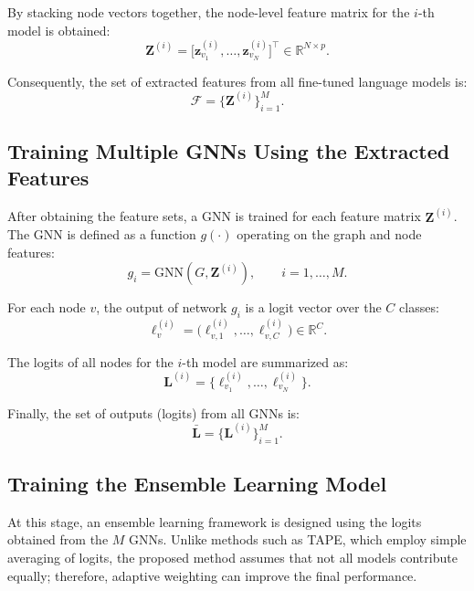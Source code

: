 \documentclass[a4paper,fleqn]{cas-sc}
\begin{document}
By stacking node vectors together, the node-level feature matrix for the $i$-th model is obtained:
\begin{equation}
\mathbf{Z}^{(i)}=\big[\mathbf{z}^{(i)}_{v_1},\dots,\mathbf{z}^{(i)}_{v_N}\big]^{\top}\in\mathbb{R}^{N\times p}.
\end{equation}

Consequently, the set of extracted features from all fine-tuned language models is:
\begin{equation}
\mathcal{F}=\{\mathbf{Z}^{(i)}\}_{i=1}^{M}.
\end{equation}

\subsection{Training Multiple GNNs Using the Extracted Features}

After obtaining the feature sets, a GNN is trained for each feature matrix $\mathbf{Z}^{(i)}$. The GNN is defined as a function $g(\cdot)$ operating on the graph and node features:
\begin{equation}
g_i = \mathrm{GNN}(G,\mathbf{Z}^{(i)}), \qquad i=1,\dots,M.
\end{equation}

For each node $v$, the output of network $g_i$ is a logit vector over the $C$ classes:
\begin{equation}
\boldsymbol{\ell}^{(i)}_{v}=\big(\ell^{(i)}_{v,1},\dots,\ell^{(i)}_{v,C}\big)\in\mathbb{R}^{C}.
\end{equation}

The logits of all nodes for the $i$-th model are summarized as:
\begin{equation}
\mathbf{L}^{(i)}=\{\boldsymbol{\ell}^{(i)}_{v_1},\dots,\boldsymbol{\ell}^{(i)}_{v_N}\}.
\end{equation}

Finally, the set of outputs (logits) from all GNNs is:
\begin{equation}
\bar{\mathbf{L}}=\{\mathbf{L}^{(i)}\}_{i=1}^{M}.
\end{equation}

\subsection{Training the Ensemble Learning Model}

At this stage, an ensemble learning framework is designed using the logits obtained from the $M$ GNNs. Unlike methods such as TAPE, which employ simple averaging of logits, the proposed method assumes that not all models contribute equally; therefore, adaptive weighting can improve the final performance.
\end{document}
